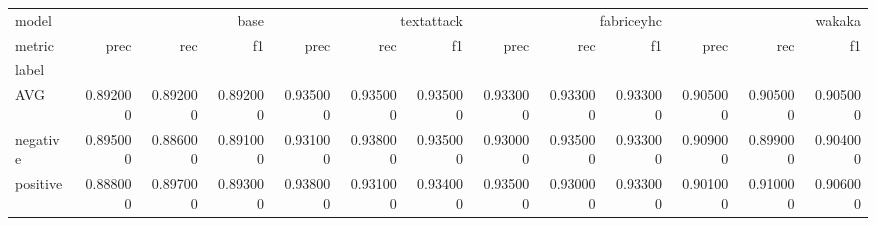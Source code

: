 \begin{tabular}{lrrrrrrrrrrrr}
model & \multicolumn{3}{r}{base} & \multicolumn{3}{r}{textattack} & \multicolumn{3}{r}{fabriceyhc} & \multicolumn{3}{r}{wakaka} \\
metric & prec & rec & f1 & prec & rec & f1 & prec & rec & f1 & prec & rec & f1 \\
label &  &  &  &  &  &  &  &  &  &  &  &  \\
AVG & 0.892000 & 0.892000 & 0.892000 & 0.935000 & 0.935000 & 0.935000 & 0.933000 & 0.933000 & 0.933000 & 0.905000 & 0.905000 & 0.905000 \\
negative & 0.895000 & 0.886000 & 0.891000 & 0.931000 & 0.938000 & 0.935000 & 0.930000 & 0.935000 & 0.933000 & 0.909000 & 0.899000 & 0.904000 \\
positive & 0.888000 & 0.897000 & 0.893000 & 0.938000 & 0.931000 & 0.934000 & 0.935000 & 0.930000 & 0.933000 & 0.901000 & 0.910000 & 0.906000 \\
\end{tabular}
